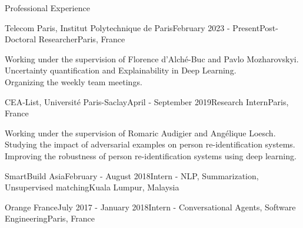 \documentclass{resume} %
\begin{document}
\begin{rSection}{Professional Experience}

\begin{rSubsection}{Telecom Paris, Institut Polytechnique de Paris}{February 2023 - Present}{Post-Doctoral Researcher}{Paris, France}
\item[] Working under the supervision of Florence d'Alché-Buc and Pavlo Mozharovskyi. \\
Uncertainty quantification and Explainability in Deep Learning. \\
Organizing the weekly team meetings.
    
\end{rSubsection}

\begin{rSubsection}{CEA-List, Université Paris-Saclay}{April - September 2019}{Research Intern}{Paris, France}

\item[] Working under the supervision of Romaric Audigier and Angélique Loesch. \\ Studying the impact of adversarial examples on person re-identification systems. \\
Improving the robustness of person re-identification systems using deep learning.
\end{rSubsection}


\begin{rSubsection}{SmartBuild Asia}{February - August 2018}{Intern - NLP, Summarization, Unsupervised matching}{Kuala Lumpur, Malaysia}
\item[] 
\vspace{-15pt}
\end{rSubsection}


\begin{rSubsection}{Orange France}{July 2017 - January 2018}{Intern - Conversational Agents, Software Engineering}{Paris, France}
\item[] 
\vspace{-15pt}
\end{rSubsection}
\vspace{-18pt}

\end{rSection}
\end{document}
